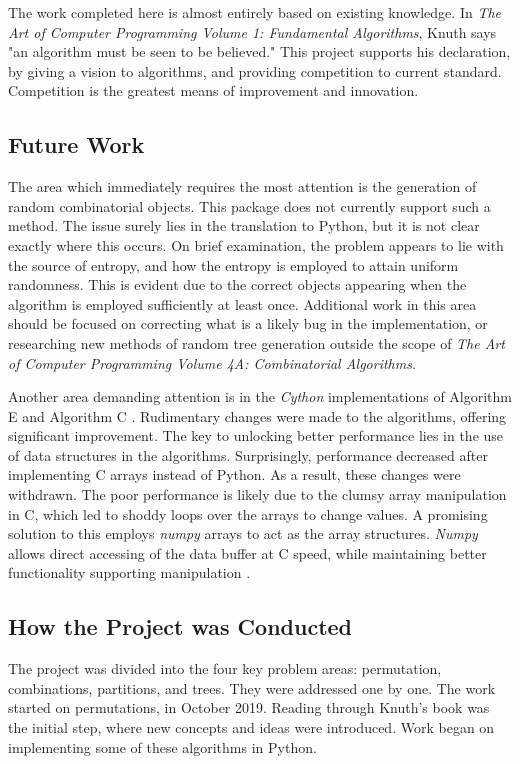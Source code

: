 \documentclass[12pt]{article}
\begin{document}
The work completed here is almost entirely based on existing knowledge. In \textit{The Art of Computer Programming Volume 1: Fundamental Algorithms}, Knuth says "an algorithm must be seen to be believed." This project supports his declaration, by giving a vision to algorithms, and providing competition to current standard. Competition is the greatest means of improvement and innovation.

\subsection{Future Work}
The area which immediately requires the most attention is the generation of random combinatorial objects. This package does not currently support such a method. The issue surely lies in the translation to Python, but it is not clear exactly where this occurs. On brief examination, the problem appears to lie with the source of entropy, and how the entropy is employed to attain uniform randomness. This is evident due to the correct objects appearing when the algorithm is employed sufficiently at least once. Additional work in this area should be focused on correcting what is a likely bug in the implementation, or researching new methods of random tree generation outside the scope of \textit{The Art of Computer Programming Volume 4A: Combinatorial Algorithms}.

Another area demanding attention is in the \textit{Cython} implementations of Algorithm E \cite{perm_E} and Algorithm C \cite{comb_C}. Rudimentary changes were made to the algorithms, offering significant improvement. The key to unlocking better performance lies in the use of data structures in the algorithms. Surprisingly, performance decreased after implementing C arrays instead of Python. As a result, these changes were withdrawn. The poor performance is likely due to the clumsy array manipulation in C, which led to shoddy loops over the arrays to change values. A promising solution to this employs \textit{numpy} arrays to act as the array structures. \textit{Numpy} allows  direct accessing of the data buffer at C speed, while maintaining better functionality supporting manipulation \cite{numpy}.

\subsection{How the Project was Conducted}
The project was divided into the four key problem areas: permutation, combinations, partitions, and trees. They were addressed one by one. The work started on permutations, in October 2019. Reading through Knuth's book was the initial step, where new concepts and ideas were introduced. Work began on implementing some of these algorithms in Python.
\end{document}
